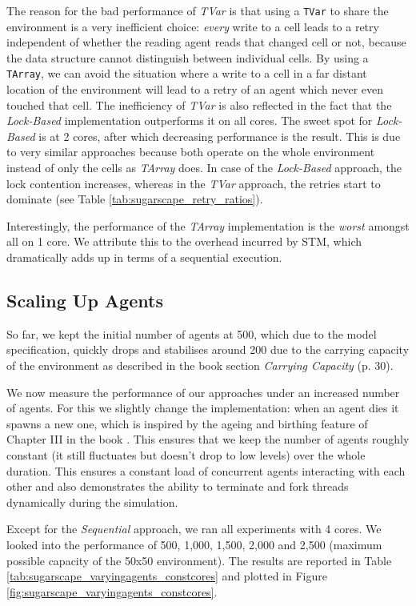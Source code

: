 The reason for the bad performance of \textit{TVar} is that using a \texttt{TVar} to share the environment is a very inefficient choice: \textit{every} write to a cell leads to a retry independent of whether the reading agent reads that changed cell or not, because the data structure cannot distinguish between individual cells. By using a \texttt{TArray}, we can avoid the situation where a write to a cell in a far distant location of the environment will lead to a retry of an agent which never even touched that cell. The inefficiency of \textit{TVar} is also reflected in the fact that the \textit{Lock-Based} implementation outperforms it on all cores. The sweet spot for \textit{Lock-Based} is at 2 cores, after which decreasing performance is the result. This is due to very similar approaches because both operate on the whole environment instead of only the cells as \textit{TArray} does. In case of the \textit{Lock-Based} approach, the lock contention increases, whereas in the \textit{TVar} approach, the retries start to dominate (see Table \ref{tab:sugarscape_retry_ratios}).

Interestingly, the performance of the \textit{TArray} implementation is the \textit{worst} amongst all on 1 core. We attribute this to the overhead incurred by STM, which dramatically adds up in terms of a sequential execution.

\subsection{Scaling Up Agents}
So far, we kept the initial number of agents at 500, which due to the model specification, quickly drops and stabilises around 200 due to the carrying capacity of the environment as described in the book \cite{epstein_growing_1996} section \textit{Carrying Capacity} (p. 30).

We now measure the performance of our approaches under an increased number of agents. For this we slightly change the implementation: when an agent dies it spawns a new one, which is inspired by the ageing and birthing feature of Chapter III in the book \cite{epstein_growing_1996}. This ensures that we keep the number of agents roughly constant (it still fluctuates but doesn't drop to low levels) over the whole duration. This ensures a constant load of concurrent agents interacting with each other and also demonstrates the ability to terminate and fork threads dynamically during the simulation.

Except for the \textit{Sequential} approach, we ran all experiments with 4 cores. We looked into the performance of 500, 1,000, 1,500, 2,000 and 2,500 (maximum possible capacity of the 50x50 environment). The results are reported in Table \ref{tab:sugarscape_varyingagents_constcores} and plotted in Figure \ref{fig:sugarscape_varyingagents_constcores}.

